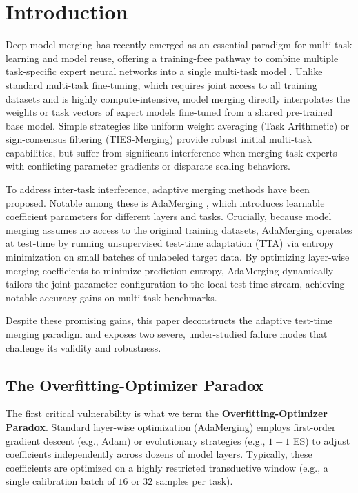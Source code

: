 \section{Introduction}
\label{sec:intro}

Deep model merging has recently emerged as an essential paradigm for multi-task learning and model reuse, offering a training-free pathway to combine multiple task-specific expert neural networks into a single multi-task model \cite{ilharco2022editing, wortsman2022model, yadav2023resolving}. Unlike standard multi-task fine-tuning, which requires joint access to all training datasets and is highly compute-intensive, model merging directly interpolates the weights or task vectors of expert models fine-tuned from a shared pre-trained base model. Simple strategies like uniform weight averaging (Task Arithmetic) \cite{ilharco2022editing} or sign-consensus filtering (TIES-Merging) \cite{yadav2023resolving} provide robust initial multi-task capabilities, but suffer from significant interference when merging task experts with conflicting parameter gradients or disparate scaling behaviors.

To address inter-task interference, adaptive merging methods have been proposed. Notable among these is AdaMerging \cite{yang2024adamerging}, which introduces learnable coefficient parameters for different layers and tasks. Crucially, because model merging assumes no access to the original training datasets, AdaMerging operates at test-time by running unsupervised test-time adaptation (TTA) via entropy minimization on small batches of unlabeled target data. By optimizing layer-wise merging coefficients to minimize prediction entropy, AdaMerging dynamically tailors the joint parameter configuration to the local test-time stream, achieving notable accuracy gains on multi-task benchmarks.

Despite these promising gains, this paper deconstructs the adaptive test-time merging paradigm and exposes two severe, under-studied failure modes that challenge its validity and robustness. 

\subsection{The Overfitting-Optimizer Paradox}
The first critical vulnerability is what we term the \textbf{Overfitting-Optimizer Paradox}. Standard layer-wise optimization (AdaMerging) employs first-order gradient descent (e.g., Adam) or evolutionary strategies (e.g., $1+1$ ES) to adjust coefficients independently across dozens of model layers. Typically, these coefficients are optimized on a highly restricted transductive window (e.g., a single calibration batch of $16$ or $32$ samples per task). 

